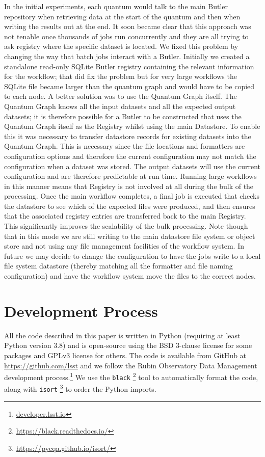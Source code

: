 \documentclass[]{spie}
\begin{document}
In the initial experiments, each quantum would talk to the main Butler repository when retrieving data at the start of the quantum and then when writing the results out at the end.
It soon became clear that this approach was not tenable once thousands of jobs run concurrently and they are all trying to ask registry where the specific dataset is located.
We fixed this problem by changing the way that batch jobs interact with a Butler.
Initially we created a standalone read-only SQLite Butler registry containing the relevant information for the workflow; that did fix the problem but for very large workflows the SQLite file became larger than the quantum graph and would have to be copied to each node.
A better solution was to use the Quantum Graph itself.
The Quantum Graph knows all the input datasets and all the expected output datasets; it is therefore possible for a Butler to be constructed that uses the Quantum Graph itself as the Registry whilst using the main Datastore.
To enable this it was necessary to transfer datastore records for existing datasets into the Quantum Graph.
This is necessary since the file locations and formatters are configuration options and therefore the current configuration may not match the configuration when a dataset was stored.
The output datasets will use the current configuration and are therefore predictable at run time.
Running large workflows in this manner means that Registry is not involved at all during the bulk of the processing.
Once the main workflow completes, a final job is executed that checks the datastore to see which of the expected files were produced, and then ensures that the associated registry entries are transferred back to the main Registry.
This significantly improves the scalability of the bulk processing.
Note though that in this mode we are still writing to the main datastore file system or object store and not using any file management facilities of the workflow system.
In future we may decide to change the configuration to have the jobs write to a local file system datastore (thereby matching all the formatter and file naming configuration) and have the workflow system move the files to the correct nodes.

\section{Development Process}

All the code described in this paper is written in Python (requiring at least Python version 3.8\cite{2020ASPC..522..541J}) and is open-source using the BSD 3-clause license for some packages and GPLv3 license for others.
The code is available from GitHub at \url{https://github.com/lsst} and we follow the Rubin Observatory Data Management development process.\footnote{\url{developer.lsst.io}}\cite{2018SPIE10707E..09J}
We use the \texttt{black} \footnote{\url{https://black.readthedocs.io/}} tool to automatically format the code, along with \texttt{isort} \footnote{\url{https://pycqa.github.io/isort/}} to order the Python imports.
\end{document}
